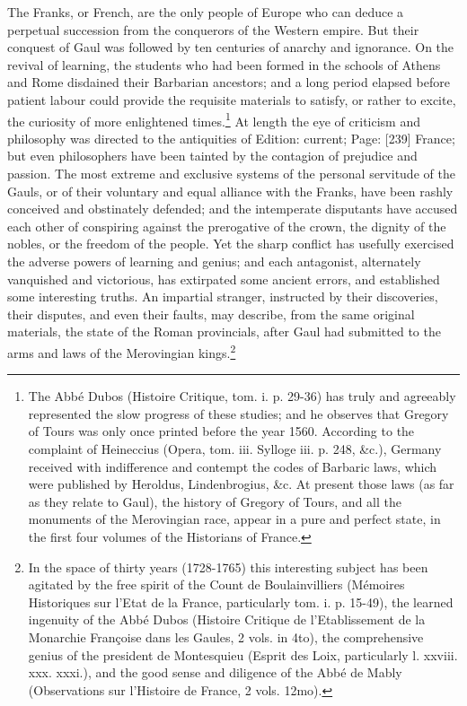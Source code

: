 The Franks, or French, are the only people of Europe who can deduce a perpetual succession from the conquerors of the Western empire. But their conquest of Gaul was followed by ten centuries of anarchy and ignorance. On the revival of learning, the students who had been formed in the schools of Athens and Rome disdained their Barbarian ancestors; and a long period elapsed before patient labour could provide the requisite materials to satisfy, or rather to excite, the curiosity of more enlightened times.\footnote{The Abbé Dubos (Histoire Critique, tom. i. p. 29-36) has truly and agreeably represented the slow progress of these studies; and he observes that Gregory of Tours was only once printed before the year 1560. According to the complaint of Heineccius (Opera, tom. iii. Sylloge iii. p. 248, \&c.), Germany received with indifference and contempt the codes of Barbaric laws, which were published by Heroldus, Lindenbrogius, \&c. At present those laws (as far as they relate to Gaul), the history of Gregory of Tours, and all the monuments of the Merovingian race, appear in a pure and perfect state, in the first four volumes of the Historians of France.} At length the eye of criticism and philosophy was directed to the antiquities of Edition: current; Page: [239] France; but even philosophers have been tainted by the contagion of prejudice and passion. The most extreme and exclusive systems of the personal servitude of the Gauls, or of their voluntary and equal alliance with the Franks, have been rashly conceived and obstinately defended; and the intemperate disputants have accused each other of conspiring against the prerogative of the crown, the dignity of the nobles, or the freedom of the people. Yet the sharp conflict has usefully exercised the adverse powers of learning and genius; and each antagonist, alternately vanquished and victorious, has extirpated some ancient errors, and established some interesting truths. An impartial stranger, instructed by their discoveries, their disputes, and even their faults, may describe, from the same original materials, the state of the Roman provincials, after Gaul had submitted to the arms and laws of the Merovingian kings.\footnote{In the space of thirty years (1728-1765) this interesting subject has been agitated by the free spirit of the Count de Boulainvilliers (Mémoires Historiques sur l\texthebrew{}’Etat de la France, particularly tom. i. p. 15-49), the learned ingenuity of the Abbé Dubos (Histoire Critique de l\texthebrew{}’Etablissement de la Monarchie Françoise dans les Gaules, 2 vols. in 4to), the comprehensive genius of the president de Montesquieu (Esprit des Loix, particularly l. xxviii. xxx. xxxi.), and the good sense and diligence of the Abbé de Mably (Observations sur l\texthebrew{}’Histoire de France, 2 vols. 12mo).}

